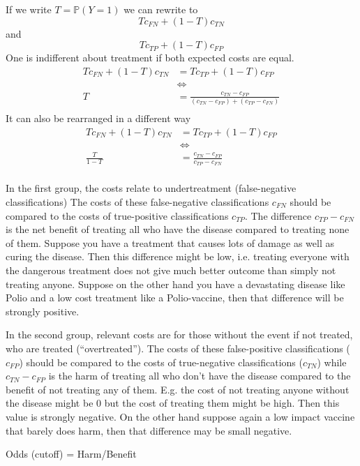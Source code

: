 	If we write $T = \mathbb{P}(Y = 1)$ we can rewrite to
	\[
		T c_{FN} + (1-T) c_{TN}
	\]
	and
	\[
		T c_{TP} + (1-T) c_{FP}
	\]
	One is indifferent about treatment if both expected costs are equal.
	\[
	\begin{aligned}
		T c_{FN} + (1-T) c_{TN} &= T c_{TP} + (1-T) c_{FP} \\
		&\Leftrightarrow \\
		T &= \frac{c_{TN} - c_{FP}}{(c_{TN} - c_{FP}) + (c_{TP} - c_{FN})} \\
	\end{aligned}
	\]
	It can also be rearranged in a different way
	\[
	\begin{aligned}
		T c_{FN} + (1-T) c_{TN} &= T c_{TP} + (1-T) c_{FP} \\
		&\Leftrightarrow \\
		\frac{T}{1 - T} &= \frac{ c_{TN} - c_{FP} }{ c_{TP} - c_{FN} } \\
	\end{aligned}
	\]
	
	In the first group, the costs relate to undertreatment (false-negative classifications)
	The costs of these false-negative classifications $c_{FN}$ should be compared to the costs of true-positive classifications $c_{TP}$.
	The difference $c_{TP} - c_{FN}$ is the net benefit of treating all who have the disease compared to treating none of them.
	Suppose you have a treatment that causes lots of damage as well as curing the disease. 
	Then this difference might be low, i.e. treating everyone with the dangerous treatment does not give much better outcome than simply not treating anyone.
	Suppose on the other hand you have a devastating disease like Polio and a low cost treatment like a Polio-vaccine, then that difference will be strongly positive.
	
	In the second group, relevant costs are for those without the event if not treated, who are treated (“overtreated”).
	The costs of these false-positive classifications ($c_{FP}$) should be compared to the costs of true-negative classifications ($c_{TN}$)
	while $c_{TN} - c_{FP}$ is the harm of treating all who don't have the disease compared to the benefit of not treating any of them.
	E.g. the cost of not treating anyone without the disease might be 0 but the cost of treating them might be high. Then this value is strongly negative.
	On the other hand suppose again a low impact vaccine that barely does harm, then that difference may be small negative. 
	
	Odds (cutoff) = Harm/Benefit
	
